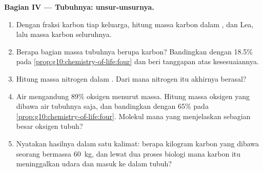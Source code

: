 \begin{problem}
\medskip
\noindent\textbf{Bagian IV --- Tubuhnya: unsur-unsurnya.}
\begin{enumerate}[resume]
  \item Dengan fraksi karbon tiap keluarga, hitung massa karbon dalam
        ,  dan  Lea, lalu massa karbon
        seluruhnya.
  \item Berapa bagian massa tubuhnya berupa karbon? Bandingkan dengan
        18.5\% pada \cref{prop:g10:chemistry-of-life:four} dan beri
        tanggapan atas kesesuaiannya.
  \item Hitung massa nitrogen dalam . Dari mana nitrogen itu
        akhirnya berasal?
  \item Air mengandung 89\% oksigen menurut massa. Hitung massa oksigen
        yang dibawa air tubuhnya saja, dan bandingkan dengan 65\% pada
        \cref{prop:g10:chemistry-of-life:four}. Molekul mana yang
        menjelaskan sebagian besar oksigen tubuh?
  \item Nyatakan hasilnya dalam satu kalimat: berapa kilogram karbon
        yang dibawa seorang bermassa \qty{60}{kg}, dan lewat dua proses
        biologi mana karbon itu meninggalkan udara dan masuk ke dalam
        tubuh?
\end{enumerate}
\end{problem}
